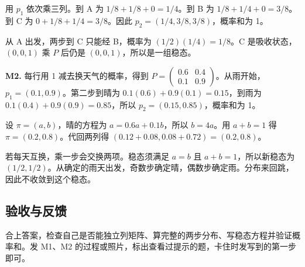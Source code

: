 \documentclass[UTF8,a4paper,11pt]{ctexart}
\begin{document}
用 $p_1$ 依次乘三列。到 A 为 $1/8+1/8+0=1/4$。到 B 为 $1/8+1/4+0=3/8$。到 C 为 $0+1/8+1/4=3/8$。因此 $p_2=(1/4,3/8,3/8)$，概率和为 1。

从 A 出发，两步到 C 只能经 B，概率为 $(1/2)(1/4)=1/8$。C 是吸收状态，$(0,0,1)$ 乘 $P$ 后仍是 $(0,0,1)$，所以是一组稳态。

\textbf{M2.} 每行用 1 减去换天气的概率，得到 $P=\begin{pmatrix}0.6&0.4\\0.1&0.9\end{pmatrix}$。从雨开始，$p_1=(0.1,0.9)$。第二步到晴为 $0.1(0.6)+0.9(0.1)=0.15$，到雨为 $0.1(0.4)+0.9(0.9)=0.85$，所以 $p_2=(0.15,0.85)$，概率和为 1。

设 $\pi=(a,b)$，晴的方程为 $a=0.6a+0.1b$，所以 $b=4a$。用 $a+b=1$ 得 $\pi=(0.2,0.8)$。代回两列得 $(0.12+0.08,0.08+0.72)=(0.2,0.8)$。

若每天互换，乘一步会交换两项。稳态须满足 $a=b$ 且 $a+b=1$，所以新稳态为 $(1/2,1/2)$。从确定的雨天出发，奇数步确定晴，偶数步确定雨。分布来回跳，因此不收敛到这个稳态。

\subsection{验收与反馈}
合上答案，检查自己是否能独立列矩阵、算完整的两步分布、写稳态方程并验证概率和。发 M1、M2 的过程或照片，标出查看过提示的题，卡住时发写到的第一步即可。
\end{document}
